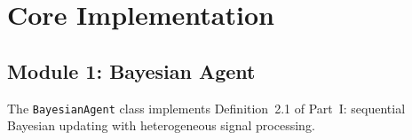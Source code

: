 \documentclass[12pt,a4paper]{article}
\theoremstyle{definition}
\begin{document}

\section{Core Implementation}\label{sec:implementation}

\subsection{Module 1: Bayesian Agent}

The \texttt{BayesianAgent} class implements Definition~2.1 of Part~I: sequential Bayesian updating with heterogeneous signal processing.
\end{document}
